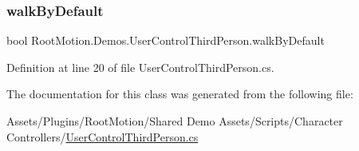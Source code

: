 \subsubsection{\texorpdfstring{walk\+By\+Default}{walkByDefault}}
{\footnotesize\ttfamily bool Root\+Motion.\+Demos.\+User\+Control\+Third\+Person.\+walk\+By\+Default}



Definition at line 20 of file User\+Control\+Third\+Person.\+cs.



The documentation for this class was generated from the following file\+:\begin{DoxyCompactItemize}
\item 
Assets/\+Plugins/\+Root\+Motion/\+Shared Demo Assets/\+Scripts/\+Character Controllers/\mbox{\hyperlink{_user_control_third_person_8cs}{User\+Control\+Third\+Person.\+cs}}\end{DoxyCompactItemize}
